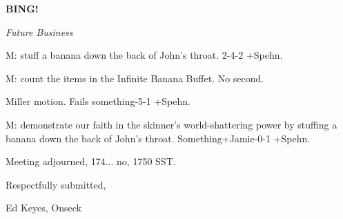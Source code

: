 \documentclass[12pt]{article}
\newcommand{\bing}{{\bf BING!} }
\newcommand{\goto}[1]{\bing \vskip 12pt \centerline{{\em{#1}}}}
\begin{document}
\goto{Future Business}

M: stuff a banana down the back of John's throat. 2-4-2 +Spehn.

M: count the items in the Infinite Banana Buffet. No second.

Miller motion. Fails something-5-1 +Spehn.

M: demonstrate our faith in the skinner's world-shattering power by stuffing a banana down the back of John's throat. Something+Jamie-0-1 +Spehn.

\vspace{12pt}

\noindent
Meeting adjourned, 174... no, 1750 SST.

\vspace{18pt}

\centerline{Respectfully submitted,}
\centerline{Ed Keyes, Onseck}
\end{document}
